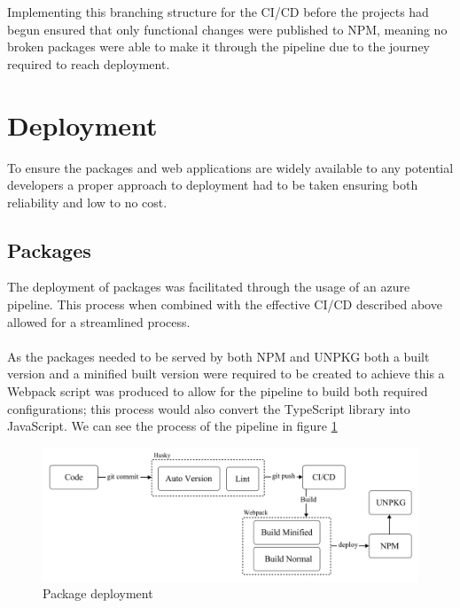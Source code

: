 \documentclass{l4proj}
\begin{document}
Implementing this branching structure for the CI/CD before the projects had begun ensured that only functional changes were published to NPM, meaning no broken packages were able to make it through the pipeline due to the journey required to reach deployment.

\section{Deployment}
To ensure the packages and web applications are widely available to any potential developers a proper approach to deployment had to be taken ensuring both reliability and low to no cost.

\subsection{Packages}
The deployment of packages was facilitated through the usage of an azure pipeline. This process when combined with the effective CI/CD described above allowed for a streamlined process.
\\ \\
As the packages needed to be served by both NPM and UNPKG both a built version and a minified built version were required to be created to achieve this a Webpack script was produced to allow for the pipeline to build both required configurations; this process would also convert the TypeScript library into JavaScript. We can see the process of the pipeline in figure \ref{fig:deployment}

\begin{figure}[!ht]
    \begin{center}
    \includegraphics[width=14cm]{dissertation/images/Deployment.png}
    \end{center}
    \caption{Package deployment}
    \label{fig:deployment}
\end{figure}
\end{document}
